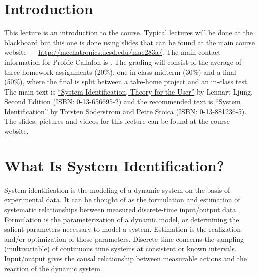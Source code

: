 \mainmatter%
\setcounter{page}{1}

\lectureseries[\course]{\course}

\date{September 24, 2009}

\setaddress%

\setcounter{lecture}{0}
\setcounter{chapter}{0}


\section{Introduction}
This lecture is an introduction to the course.
Typical lectures will be done at the blackboard but this one is done using slides that can be found at the main course website --- \href{http://mechatronics.ucsd.edu/mae283a/}{http://mechatronics.ucsd.edu/mae283a/}.
The main contact information for Prof\. de Callafon is \mailto{\authEmail}{\authEmail}.
The grading will consist of the average of three homework assignments (20\%), one in-class midterm (30\%) and a final (50\%), where the final is split between a take-home project and an in-class test.
The main text is
\href{http://www.amazon.com/s/ref=nb\_ss?url=search-alias\%3Daps\&field-keywords=0-13-656695-2&x=0\&y=0}
{``System Identification, Theory for the User''} by Lennart Ljung, Second Edition (ISBN: 0-13-656695-2) and the recommended text is%
\href{http://www.amazon.com/s/ref=nb\_ss?url=search-alias\%3Daps\&field-keywords=0-13-881236-5&x=0\&y=0}
{``System Identification''} by Torsten Soderstrom and Petre Stoica (ISBN: 0-13-881236-5).%
The slides, pictures and videos for this lecture can be found at the course website.

\section{What Is System Identification?}
System identification is the modeling of a dynamic system on the basis of experimental data.
It can be thought of as the formulation and estimation of systematic relationships between measured discrete-time input/output data.
Formulation is the parameterization of a dynamic model, or determining the salient parameters necessary to model a system.
Estimation is the realization and/or optimization of those parameters.
Discrete time concerns the sampling (multivariable) of continuous time systems at consistent or known intervals.
Input/output gives the causal relationship between measurable actions and the reaction of the dynamic system.

